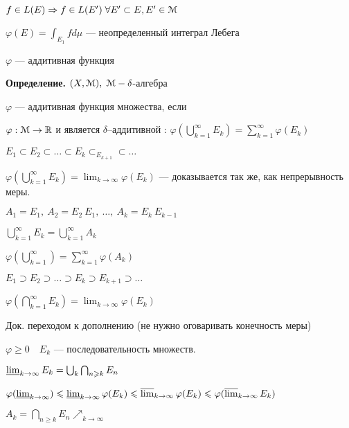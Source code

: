 $f \in L(E) \Rightarrow f \in L(E') \; \forall E' \subset E, E'
\in \EuScript{M}$

$\varphi(E) = \int_{E_1} f d \mu$ --- неопределенный интеграл
Лебега

$\varphi$ --- аддитивная функция

\textbf{Определение.} \quad $(X, \EuScript{M}), \; \EuScript{M} -
\delta$-алгебра

$\varphi$ --- аддитивная функция множества, если

$\varphi: \EuScript{M} \rightarrow \mathbb{R}$ и является
 $\delta$--аддитивной : $\varphi(\bigcup_{k=1}^{\infty} E_k) =
\sum_{k=1}^{\infty}\varphi(E_k)$

$E_1 \subset E_2 \subset \ldots \subset E_k \subset_{E_{k+1}}
\subset \ldots$

$\varphi(\bigcup_{k=1}^\infty E_k) = \lim_{k \rightarrow \infty}
\varphi (E_k)$ --- доказывается так же, как непрерывность меры.

$A_1 = E_1, \: A_2 = E_2 \ E_1, \: \ldots, \: A_k = E_k \ E_{k-1}$

$\bigcup_{k=1}^\infty E_k = \bigcup_{k=1}^\infty A_k$

$\varphi(\bigcup_{k=1}^\infty) = \sum_{k=1}^\infty \varphi(A_k)$

$E_1 \supset E_2 \supset \ldots \supset E_k \supset E_{k+1}
\supset \ldots$

$\varphi(\bigcap_{k=1}^\infty E_k) = \lim_{k \rightarrow \infty}
\varphi(E_k)$


%
%
%
%
%
%
%
%
%
%
%
%
Док. переходом к дополнению (не нужно оговаривать конечность меры)

 $\varphi \geqslant 0 \quad E_k$ --- последовательность множеств.

$\varliminf_{k \rightarrow \infty} E_k = \bigcup_k \bigcap_{n
\geqslant k} E_n$

$\varphi(\varliminf_{k \rightarrow \infty}) \leqslant
\varliminf_{k \rightarrow \infty} \varphi(E_k) \leqslant
\varlimsup_{k \rightarrow \infty} \varphi(E_k) \leqslant
\varphi(\varlimsup_{k \rightarrow \infty} E_k)$


$A_k = \bigcap_{n \geqslant k} E_n \nearrow_{k \rightarrow
\infty}$

